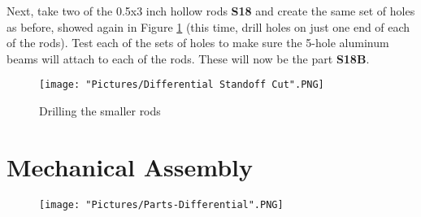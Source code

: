 \documentclass[12pt]{article}
\begin{document}
\noindent Next, take two of the 0.5x3 inch hollow rods \textbf{S18} and create the same set of holes as before, showed again in Figure \ref{dpv} (this time, drill holes on just one end of each of the rods). Test each of the sets of holes to make sure the 5-hole aluminum beams will attach to each of the rods. These will now be the part \textbf{S18B}.

\begin{figure}[H]
	\centering
	\texttt{[image: "Pictures/Differential Standoff Cut".PNG]}
	\caption{Drilling the smaller rods}
	\label{dpv}
\end{figure}

\newpage

\section{Mechanical Assembly}


\begin{figure}[H]
	\centering
	\texttt{[image: "Pictures/Parts-Differential".PNG]}
\end{figure}
\end{document}
